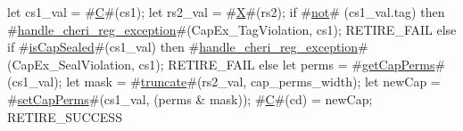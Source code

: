 let cs1_val = #\hyperref[sailRISCVzC]{C}#(cs1);
let rs2_val = #\hyperref[sailRISCVzX]{X}#(rs2);
if #\hyperref[sailRISCVznot]{not}# (cs1_val.tag) then {
  #\hyperref[sailRISCVzhandlezycherizyregzyexception]{handle\_cheri\_reg\_exception}#(CapEx_TagViolation, cs1);
  RETIRE_FAIL
} else if #\hyperref[sailRISCVzisCapSealed]{isCapSealed}#(cs1_val) then {
  #\hyperref[sailRISCVzhandlezycherizyregzyexception]{handle\_cheri\_reg\_exception}#(CapEx_SealViolation, cs1);
  RETIRE_FAIL
} else {
  let perms = #\hyperref[sailRISCVzgetCapPerms]{getCapPerms}#(cs1_val);
  let mask = #\hyperref[sailRISCVztruncate]{truncate}#(rs2_val, cap_perms_width);
  let newCap = #\hyperref[sailRISCVzsetCapPerms]{setCapPerms}#(cs1_val, (perms & mask));
  #\hyperref[sailRISCVzC]{C}#(cd) = newCap;
  RETIRE_SUCCESS
}
